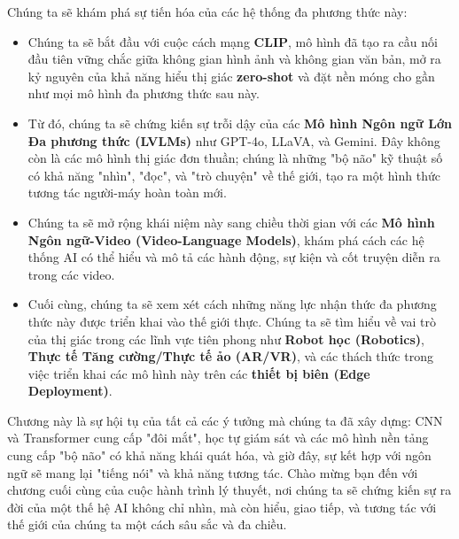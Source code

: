 Chúng ta sẽ khám phá sự tiến hóa của các hệ thống đa phương thức này:
\begin{itemize}
	\item Chúng ta sẽ bắt đầu với cuộc cách mạng \textbf{CLIP}, mô hình đã tạo ra cầu nối đầu tiên vững chắc giữa không gian hình ảnh và không gian văn bản, mở ra kỷ nguyên của khả năng hiểu thị giác \textbf{zero-shot} và đặt nền móng cho gần như mọi mô hình đa phương thức sau này.
	
	\item Từ đó, chúng ta sẽ chứng kiến sự trỗi dậy của các \textbf{Mô hình Ngôn ngữ Lớn Đa phương thức (LVLMs)} như GPT-4o, LLaVA, và Gemini. Đây không còn là các mô hình thị giác đơn thuần; chúng là những "bộ não" kỹ thuật số có khả năng "nhìn", "đọc", và "trò chuyện" về thế giới, tạo ra một hình thức tương tác người-máy hoàn toàn mới.
	
	\item Chúng ta sẽ mở rộng khái niệm này sang chiều thời gian với các \textbf{Mô hình Ngôn ngữ-Video (Video-Language Models)}, khám phá cách các hệ thống AI có thể hiểu và mô tả các hành động, sự kiện và cốt truyện diễn ra trong các video.
	
	\item Cuối cùng, chúng ta sẽ xem xét cách những năng lực nhận thức đa phương thức này được triển khai vào thế giới thực. Chúng ta sẽ tìm hiểu về vai trò của thị giác trong các lĩnh vực tiên phong như \textbf{Robot học (Robotics)}, \textbf{Thực tế Tăng cường/Thực tế ảo (AR/VR)}, và các thách thức trong việc triển khai các mô hình này trên các \textbf{thiết bị biên (Edge Deployment)}.
\end{itemize}

Chương này là sự hội tụ của tất cả các ý tưởng mà chúng ta đã xây dựng: CNN và Transformer cung cấp "đôi mắt", học tự giám sát và các mô hình nền tảng cung cấp "bộ não" có khả năng khái quát hóa, và giờ đây, sự kết hợp với ngôn ngữ sẽ mang lại "tiếng nói" và khả năng tương tác. Chào mừng bạn đến với chương cuối cùng của cuộc hành trình lý thuyết, nơi chúng ta sẽ chứng kiến sự ra đời của một thế hệ AI không chỉ nhìn, mà còn hiểu, giao tiếp, và tương tác với thế giới của chúng ta một cách sâu sắc và đa chiều.